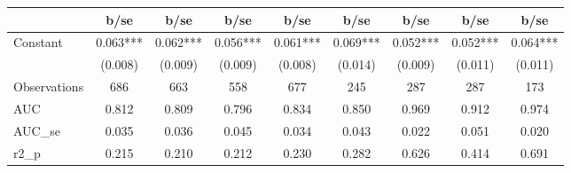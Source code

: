 \begin{tabular}{l*{8}{c}}
                                &        b/se   &        b/se   &        b/se   &        b/se   &        b/se   &        b/se   &        b/se   &        b/se   \\
\hline
Constant                        &       0.063***&       0.062***&       0.056***&       0.061***&       0.069***&       0.052***&       0.052***&       0.064***\\
                                &     (0.008)   &     (0.009)   &     (0.009)   &     (0.008)   &     (0.014)   &     (0.009)   &     (0.011)   &     (0.011)   \\


\hline
\hline
Observations                    &      686         &      663         &      558         &      677         &      245         &      287         &      287         &      173         \\
AUC                             &    0.812         &    0.809         &    0.796         &    0.834         &    0.850         &    0.969         &    0.912         &    0.974         \\
AUC\_se                          &    0.035         &    0.036         &    0.045         &    0.034         &    0.043         &    0.022         &    0.051         &    0.020         \\
r2\_p                            &    0.215         &    0.210         &    0.212         &    0.230         &    0.282         &    0.626         &    0.414         &    0.691         \\
\end{tabular}
